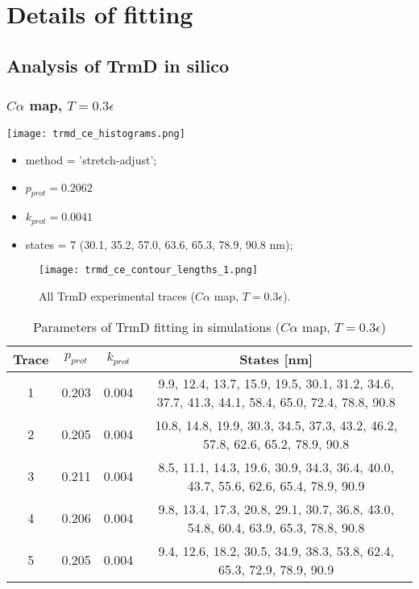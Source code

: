 \chapter{Details of fitting}
\label{ch:fit-details}

\section{Analysis of TrmD in silico}
\label{sec:fit-details-trmd-theory}

\subsection{$C\alpha$ map, $T=0.3\epsilon$}
\label{subsec:trmd-ce}
\begin{minipage}[c]{0.7\textwidth}
    \texttt{[image: trmd\_ce\_histograms.png]}
\end{minipage}
\hfill
\begin{minipage}[c]{0.45\textwidth}
    \begin{itemize}
        \item method = 'stretch-adjust';
        \item $p_{prot}=0.2062$
        \item $k_{prot}=0.0041$
        \item states = 7 (30.1, 35.2, 57.0, 63.6, 65.3, 78.9, 90.8 nm);
    \end{itemize}
\end{minipage}

\begin{figure}
    \centering
    \texttt{[image: trmd\_ce\_contour\_lengths\_1.png]}
    \caption{All TrmD experimental traces ($C\alpha$ map, $T=0.3\epsilon$).}
    \label{fig:trmd-ce-cl1}
\end{figure}

\begin{table}
    \tiny
    \centering
    \caption{Parameters of TrmD fitting in simulations ($C\alpha$ map, $T=0.3\epsilon$)}
    \label{tab:trmd-ce-parameters}
    \begin{tabular}{c|c|c|c}
        \textbf{Trace} & \textbf{$p_{prot}$} & \textbf{$k_{prot}$} & \textbf{States [nm]}\\\hline
        1 & 0.203 & 0.004 & 9.9, 12.4, 13.7, 15.9, 19.5, 30.1, 31.2, 34.6, 37.7, 41.3, 44.1, 58.4, 65.0, 72.4, 78.8, 90.8\\
        2 & 0.205 & 0.004 & 10.8, 14.8, 19.9, 30.3, 34.5, 37.3, 43.2, 46.2, 57.8, 62.6, 65.2, 78.9, 90.8\\
        3 & 0.211 & 0.004 & 8.5, 11.1, 14.3, 19.6, 30.9, 34.3, 36.4, 40.0, 43.7, 55.6, 62.6, 65.4, 78.9, 90.9\\
        4 & 0.206 & 0.004 & 9.8, 13.4, 17.3, 20.8, 29.1, 30.7, 36.8, 43.0, 54.8, 60.4, 63.9, 65.3, 78.8, 90.8\\
        5 & 0.205 & 0.004 & 9.4, 12.6, 18.2, 30.5, 34.9, 38.3, 53.8, 62.4, 65.3, 72.9, 78.9, 90.9\\\hline
    \end{tabular}
\end{table}

